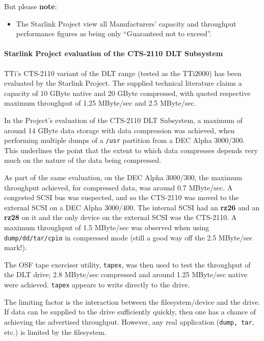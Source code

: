 But please {\bf note}:
\begin {itemize}

\item[{\LARGE\bf $\star$}] The Starlink Project view all Manufacturers' capacity
and throughput performance figures as being only ``Guaranteed not to exceed''.

\end {itemize}

\paragraph {Starlink Project evaluation of the CTS-2110 DLT Subsystem}

TTi's CTS-2110 variant of the DLT range (tested as the TTi2000) has been
evaluated by the Starlink Project. The supplied technical literature claims
a capacity of 10 GByte native and 20 GByte compressed, with quoted
respective maximum throughput of 1.25 MByte/sec and 2.5 MByte/sec.

In the Project's evaluation of the CTS-2110 DLT Subsystem, a maximum of
around 14 GByte data storage with data compression was achieved, when
performing multiple dumps of a {\tt /usr} partition from a DEC Alpha
3000/300. This underlines the point that the extent to which data compresses
depends very much on the nature of the data being compressed.

As part of the same evaluation, on the DEC Alpha 3000/300, the maximum
throughput achieved, for compressed data, was around 0.7 MByte/sec. A
congested SCSI bus was suspected, and so the CTS-2110 was moved to the
external SCSI on a DEC Alpha 3000/400. The internal SCSI had an {\bf rz26}
and an {\bf rz28} on it and the only device on the external SCSI was the
CTS-2110. A maximum throughput of 1.5 MByte/sec was observed when using
{\tt dump/dd/tar/cpio} in compressed mode (still a good way off the 2.5
MByte/sec mark!).

The OSF tape exerciser utility, {\tt tapex}, was then used to test the
throughput of the DLT drive; 2.8 MByte/sec compressed and around 1.25
MByte/sec native were achieved. {\tt tapex} appears to write directly to the
drive.

The limiting factor is the interaction between the filesystem/device and
the drive. If data can be supplied to the drive sufficiently quickly, then
one has a chance of achieving the advertised throughput. However, any real
application ({\tt dump, tar}, etc.) is limited by the filesystem.

